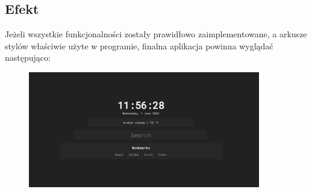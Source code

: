 \documentclass[twoside,a4paper]{report}
\begin{document}
\subsection*{Efekt}
Jeżeli wszystkie funkcjonalności zostały prawidłowo zaimplementowane, a arkusze stylów właściwie użyte w programie, finalna aplikacja powinna wyglądać następująco:
\begin{figure}[H]
    \centering
    \includegraphics[width=0.9\textwidth]{img/final_app.png}
\end{figure}

\end{document}
